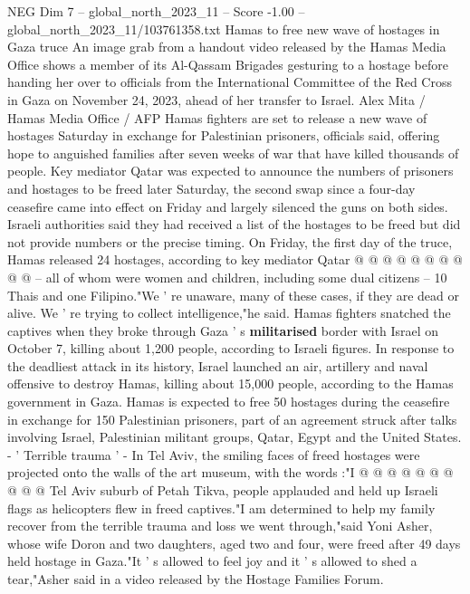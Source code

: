 \begin{textsample}{NEG Dim 7 – global\_north\_2023\_11 – Score -1.00 – global\_north\_2023\_11/103761358.txt}  \label{ex:f7_neg_324}
Hamas to free new wave of hostages in Gaza truce An image grab from a handout video released by the Hamas Media Office shows a member of its Al-Qassam Brigades gesturing to a hostage before handing her over to officials from the International Committee of the Red Cross in Gaza on November 24, 2023, ahead of her transfer to Israel.
Alex Mita / Hamas Media Office / AFP Hamas fighters are set to release a new wave of hostages Saturday in exchange for Palestinian prisoners, officials said, offering hope to anguished families after seven weeks of war that have killed thousands of people.
Key mediator Qatar was expected to announce the numbers of prisoners and hostages to be freed later Saturday, the second swap since a four-day ceasefire came into effect on Friday and largely silenced the guns on both sides.
Israeli authorities said they had received a list of the hostages to be freed but did not provide numbers or the precise timing.
On Friday, the first day of the truce, Hamas released 24 hostages, according to key mediator Qatar @ @ @ @ @ @ @ @ @ @ -- all of whom were women and children, including some dual citizens -- 10 Thais and one Filipino."We ' re unaware, many of these cases, if they are dead or alive.
We ' re trying to collect intelligence,"he said.
Hamas fighters snatched the captives when they broke through Gaza ' s \textbf{militarised} border with Israel on October 7, killing about 1,200 people, according to Israeli figures.
In response to the deadliest attack in its history, Israel launched an air, artillery and naval offensive to destroy Hamas, killing about 15,000 people, according to the Hamas government in Gaza.
Hamas is expected to free 50 hostages during the ceasefire in exchange for 150 Palestinian prisoners, part of an agreement struck after talks involving Israel, Palestinian militant groups, Qatar, Egypt and the United States. - ' Terrible trauma ' - In Tel Aviv, the smiling faces of freed hostages were projected onto the walls of the art museum, with the words :"I @ @ @ @ @ @ @ @ @ @ Tel Aviv suburb of Petah Tikva, people applauded and held up Israeli flags as helicopters flew in freed captives."I am determined to help my family recover from the terrible trauma and loss we went through,"said Yoni Asher, whose wife Doron and two daughters, aged two and four, were freed after 49 days held hostage in Gaza."It ' s allowed to feel joy and it ' s allowed to shed a tear,"Asher said in a video released by the Hostage Families Forum.

\end{textsample}
